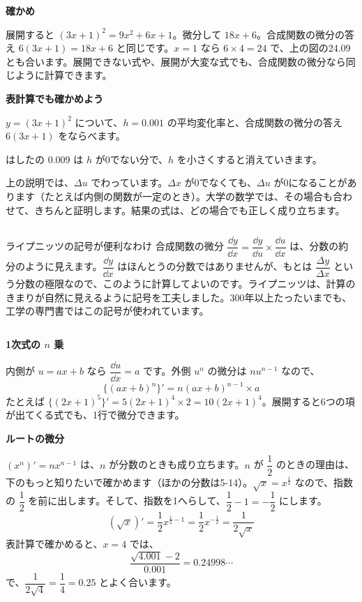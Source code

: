 \noindent\textbf{確かめ}\par
\noindent 展開すると $(3x+1)^2=9x^2+6x+1$。微分して $18x+6$。合成関数の微分の答え $6(3x+1)=18x+6$ と同じです。$x=1$ なら $6\times4=24$ で、上の図の24.09とも合います。展開できない式や、展開が大変な式でも、合成関数の微分なら同じように計算できます。

\noindent\textbf{表計算でも確かめよう}\par
\noindent $y=(3x+1)^2$ について、$h=0.001$ の平均変化率と、合成関数の微分の答え $6(3x+1)$ をならべます。
\begin{bkcenter}
\end{bkcenter}
はしたの 0.009 は $h$ が0でない分で、$h$ を小さくすると消えていきます。

\begin{seikaku}
上の説明では、$\Delta u$ でわっています。$\Delta x$ が0でなくても、$\Delta u$ が0になることがあります（たとえば内側の関数が一定のとき）。大学の数学では、その場合も合わせて、きちんと証明します。結果の式は、どの場合でも正しく成り立ちます。
\end{seikaku}

\begin{column}{ライプニッツの記号が便利なわけ}
合成関数の微分 $\dfrac{\dd y}{\dd x}=\dfrac{\dd y}{\dd u}\times\dfrac{\dd u}{\dd x}$ は、分数の約分のように見えます。$\dfrac{\dd y}{\dd x}$ はほんとうの分数ではありませんが、もとは $\dfrac{\Delta y}{\Delta x}$ という分数の極限なので、このように計算してよいのです。ライプニッツは、計算のきまりが自然に見えるように記号を工夫しました。300年以上たったいまでも、工学の専門書ではこの記号が使われています。
\end{column}


\leavevmode\label{bk:5-6:katachi}\textbf{1次式の $n$ 乗}\par
\noindent 内側が $u=ax+b$ なら $\dfrac{\dd u}{\dd x}=a$ です。外側 $u^n$ の微分は $nu^{n-1}$ なので、
\[ \{(ax+b)^n\}'=n(ax+b)^{n-1}\times a \]
たとえば $\{(2x+1)^5\}'=5(2x+1)^4\times2=10(2x+1)^4$。展開すると6つの項が出てくる式でも、1行で微分できます。

\noindent\textbf{ルートの微分}\par
\noindent $(x^n)'=nx^{n-1}$ は、$n$ が分数のときも成り立ちます。$n$ が $\dfrac{1}{2}$ のときの理由は、下のもっと知りたいで確かめます（ほかの分数は5-14）。$\sqrt{x}=x^{\frac{1}{2}}$ なので、指数の $\dfrac{1}{2}$ を前に出します。そして、指数を1へらして、$\dfrac{1}{2}-1=-\dfrac{1}{2}$ にします。
\[ (\sqrt{x})'=\frac{1}{2}x^{\frac{1}{2}-1}=\frac{1}{2}x^{-\frac{1}{2}}=\frac{1}{2\sqrt{x}} \]
表計算で確かめると、$x=4$ では、
\[ \frac{\sqrt{4.001}-2}{0.001}=0.24998\cdots \]
で、$\dfrac{1}{2\sqrt{4}}=\dfrac{1}{4}=0.25$ とよく合います。

